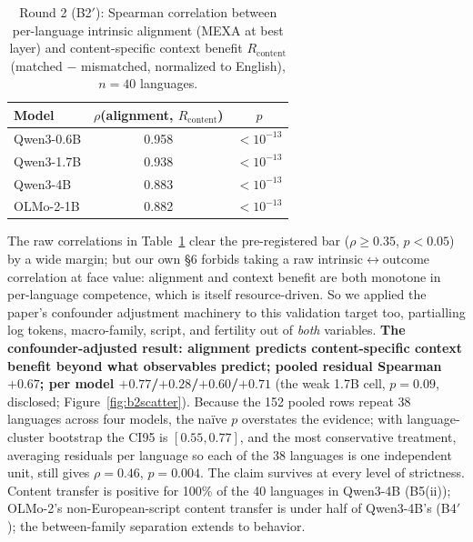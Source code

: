 \documentclass[11pt,a4paper]{article}
\begin{document}
\begin{table}[H]
\centering
\small
\caption{Round 2 (B2$'$): Spearman correlation between per-language intrinsic
alignment (MEXA at best layer) and content-specific context benefit
$R_{\mathrm{content}}$ (matched $-$ mismatched, normalized to English),
$n{=}40$ languages.}
\begin{tabular}{lcc}
\toprule
Model & $\rho$(alignment, $R_{\mathrm{content}}$) & $p$ \\
\midrule
Qwen3-0.6B & 0.958 & $<10^{-13}$ \\
Qwen3-1.7B & 0.938 & $<10^{-13}$ \\
Qwen3-4B & 0.883 & $<10^{-13}$ \\
OLMo-2-1B & 0.882 & $<10^{-13}$ \\
\bottomrule
\end{tabular}
\label{tab:b2prime}
\end{table}

The raw correlations in Table~\ref{tab:b2prime} clear the pre-registered bar
($\rho \geq 0.35$, $p<0.05$) by a wide margin; but our own \S6 forbids
taking a raw intrinsic$\leftrightarrow$outcome correlation at face value:
alignment and context benefit are both monotone in per-language competence,
which is itself resource-driven. So we applied the paper's confounder adjustment
machinery to this validation target too, partialling log tokens,
macro-family, script, and fertility out of \emph{both} variables.
\textbf{The confounder-adjusted result: alignment predicts content-specific context
benefit beyond what observables predict; pooled residual Spearman
$+0.67$; per model $+0.77$/$+0.28$/$+0.60$/$+0.71$} (the weak 1.7B cell,
$p{=}0.09$, disclosed; Figure~\ref{fig:b2scatter}). Because the 152 pooled
rows repeat 38 languages across four models, the na\"ive $p$ overstates the
evidence; with language-cluster bootstrap the CI95 is $[0.55, 0.77]$, and the
most conservative treatment, averaging residuals per language so each of
the 38 languages is one independent unit, still gives $\rho = 0.46$,
$p = 0.004$. The claim survives at every level of strictness. Content transfer is positive for 100\% of the
40 languages in Qwen3-4B (B5(ii)); OLMo-2's non-European-script content
transfer is under half of Qwen3-4B's (B4$'$); the between-family
separation extends to behavior.
\end{document}
